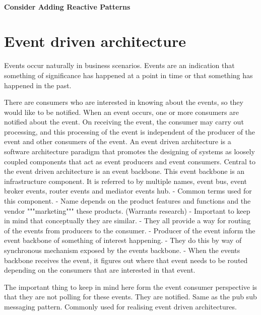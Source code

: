 \documentclass[a4paper, 11pt]{book}
\begin{document}
    \paragraph{Consider Adding Reactive Patterns}


    \section{Event driven architecture}
    Events occur naturally in business scenarios.
    Events are an indication that something of significance has happened at a point in time or that something has happened in the past.

    There are consumers who are interested in knowing about the events, so they would like to be notified.
    When an event occurs, one or more consumers are notified about the event.
    On receiving the event, the consumer may carry out processing, and this processing of the event is independent of the producer of the event and other consumers of the event.
    An event driven architecture is a software architecture paradigm that promotes the designing of systems as loosely coupled components that act as event producers and event consumers.
    Central to the event driven architecture is an event backbone.
    This event backbone is an infrastructure component.
    It is referred to by multiple names, event bus, event broker events, router events and mediator events hub.
    - Common terms used for this component.
    - Name depends on the product features and functions and the vendor """marketing""" these products. (Warrants research)
    - Important to keep in mind that conceptually they are similar.
    - They all provide a way for routing of the events from producers to the consumer.
    - Producer of the event inform the event backbone of something of interest happening.
    - They do this by way of synchronous mechanism exposed by the events backbone.
    - When the events backbone receives the event, it figures out where that event needs to be routed depending on the consumers that are interested in that event.

    The important thing to keep in mind here form the event consumer perspective is that they are not polling for these events. They are notified.
    Same as the pub sub messaging pattern.
    Commonly used for realising event driven architectures.
\end{document}
